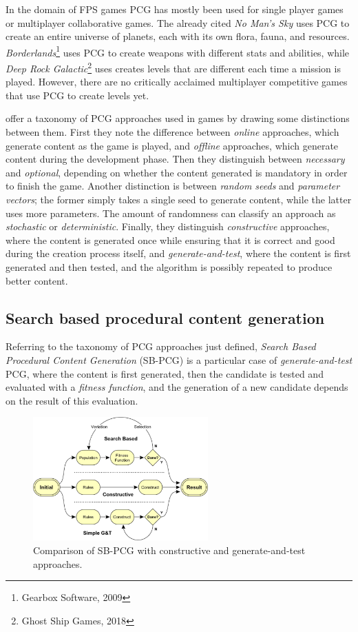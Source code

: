 \documentclass{Configuration_Files/PoliMi3i_thesis}
\begin{document}
In the domain of FPS games PCG has mostly been used for single player games or multiplayer collaborative games. The already cited \textit{No Man's Sky} uses PCG to create an entire universe of planets, each with its own flora, fauna, and resources. \textit{Borderlands}\footnote{Gearbox Software, 2009} uses PCG to create weapons with different stats and abilities, while \textit{Deep Rock Galactic}\footnote{Ghost Ship Games, 2018} uses creates levels that are different each time a mission is played. However, there are no critically acclaimed multiplayer competitive games that use PCG to create levels yet.

 offer a taxonomy of PCG approaches used in games by drawing some distinctions between them. First they note the difference between \textit{online} approaches, which generate content as the game is played, and \textit{offline} approaches, which generate content during the development phase. Then they distinguish between \textit{necessary} and \textit{optional}, depending on whether the content generated is mandatory in order to finish the game. Another distinction is between \textit{random seeds} and \textit{parameter vectors}; the former simply takes a single seed to generate content, while the latter uses more parameters. The amount of randomness can classify an approach as \textit{stochastic} or \textit{deterministic}. Finally, they distinguish \textit{constructive} approaches, where the content is generated once while ensuring that it is correct and good during the creation process itself, and \textit{generate-and-test}, where the content is first generated and then tested, and the algorithm is possibly repeated to produce better content. \cite{togelius_search-based_2010}

\subsection{Search based procedural content generation}
Referring to the taxonomy of PCG approaches just defined, \textit{Search Based Procedural Content Generation} (SB-PCG) is a particular case of \textit{generate-and-test} PCG, where the content is first generated, then the candidate is tested and evaluated with a \textit{fitness function}, and the generation of a new candidate depends on the result of this evaluation. \cite{togelius_search-based_2010}

\begin{figure}[H]
    \centering
    \includegraphics[width=0.6\textwidth]{Images/Togelius.png}
    \caption{Comparison of SB-PCG with constructive and generate-and-test approaches.}
    \label{fig:pcg}
\end{figure}
\end{document}
